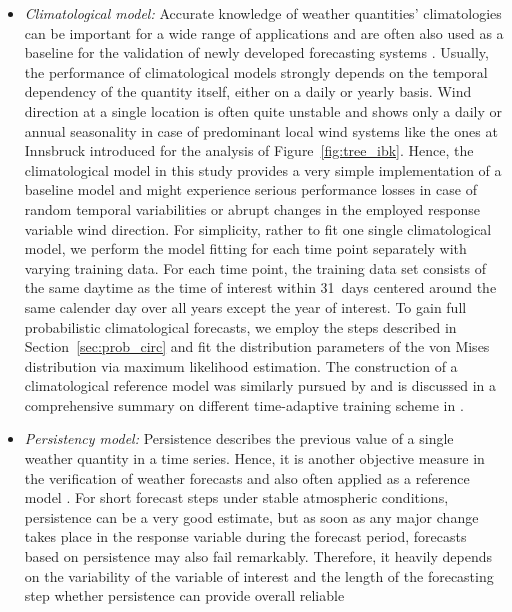 \documentclass[nojss]{jss}
\numberwithin{equation}{section}
\begin{document}
\begin{itemize}
\item \emph{Climatological model:} 
Accurate knowledge of weather quantities' climatologies can be important for a
wide range of applications and are often also used as a baseline for the
validation of newly developed forecasting systems
\citep{simon.etal:2017,stauffer.etal:2017}. Usually, the performance of
climatological models strongly depends on the temporal dependency of the
quantity itself, either on a daily or yearly basis. Wind direction at a single
location is often quite unstable and shows only a daily or annual
seasonality in case of predominant local wind systems like the ones at
Innsbruck introduced for the analysis of Figure~\ref{fig:tree_ibk}. Hence,
the climatological model in this study provides a very simple implementation of
a baseline model and might experience serious performance losses in case of
random temporal variabilities or abrupt changes in the employed response
variable wind direction.
\newline
For simplicity, rather to fit one single climatological model, we perform the
model fitting for each time point separately with varying training data. For
each time point, the training data set consists of the same daytime as the time
of interest within 31~days centered around the same calender day over all years
except the year of interest. To gain full probabilistic climatological
forecasts, we employ the steps described in Section~\ref{sec:prob_circ} and fit
the distribution parameters of the von Mises distribution via maximum
likelihood estimation. The construction of a climatological reference model
was similarly pursued by \citet{vogel.etal:2018} and is discussed in a
comprehensive summary on different time-adaptive training scheme in
\citet{lang.etal:2019c}.
\item \emph{Persistency model:}
Persistence describes the previous value of a single weather quantity in a time
series. Hence, it is another objective measure in the verification of
weather forecasts and also often applied as a reference model
\citep{noaasnationalweatherservice:2019}. For short forecast steps under stable
atmospheric conditions, persistence can be a very good estimate, but as soon as
any major change takes place in the response variable during the forecast
period, forecasts based on persistence may also fail remarkably. Therefore, it
heavily depends on the variability of the variable of interest and the length
of the forecasting step whether persistence can provide overall reliable

\end{itemize}
\end{document}
